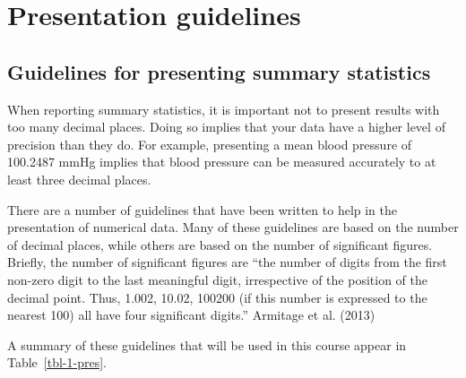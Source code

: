 \documentclass[
  a4paper,
]{memoir}
\begin{document}
\section{Presentation guidelines}\label{presentation-guidelines}

\subsection{Guidelines for presenting summary
statistics}\label{guidelines-for-presenting-summary-statistics}

When reporting summary statistics, it is important not to present
results with too many decimal places. Doing so implies that your data
have a higher level of precision than they do. For example, presenting a
mean blood pressure of 100.2487 mmHg implies that blood pressure can be
measured accurately to at least three decimal places.

There are a number of guidelines that have been written to help in the
presentation of numerical data. Many of these guidelines are based on
the number of decimal places, while others are based on the number of
significant figures. Briefly, the number of significant figures are
``the number of digits from the first non-zero digit to the last
meaningful digit, irrespective of the position of the decimal point.
Thus, 1.002, 10.02, 100200 (if this number is expressed to the nearest
100) all have four significant digits.'' Armitage et al. (2013)

A summary of these guidelines that will be used in this course appear in
Table~\ref{tbl-1-pres}.

\newpage{}
\end{document}
